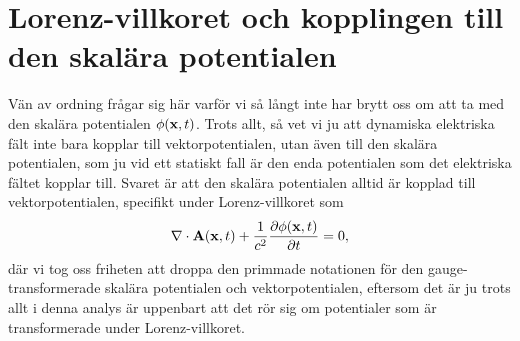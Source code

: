 \section{Lorenz-villkoret och kopplingen till den skal{\"a}ra potentialen}
V{\"a}n av ordning fr{\aa}gar sig h{\"a}r varf{\"o}r vi s{\aa} l{\aa}ngt inte
har brytt oss om att ta med den skal{\"a}ra potentialen $\phi({\bf x},t)$.
Trots allt, s{\aa} vet vi ju att dynamiska elektriska f{\"a}lt inte bara
kopplar till vektorpotentialen, utan {\"a}ven till den skal{\"a}ra potentialen,
som ju vid ett statiskt fall {\"a}r den enda potentialen som det elektriska
f{\"a}ltet kopplar till. Svaret {\"a}r att den skal{\"a}ra potentialen alltid
{\"a}r kopplad till vektorpotentialen, specifikt under Lorenz-villkoret som
$$
  \nabla\cdot{\bf A}({\bf x},t)+
    {{1}\over{c^2}}{{\partial\phi({\bf x},t)}\over{\partial t}} = 0,
$$
d{\"a}r vi tog oss friheten att droppa den primmade notationen%
f{\"o}r den gauge-transformerade skal{\"a}ra potentialen och vektorpotentialen,
eftersom det {\"a}r ju trots allt i denna analys {\"a}r uppenbart att det
r{\"o}r sig om potentialer som {\"a}r transformerade under Lorenz-villkoret.

